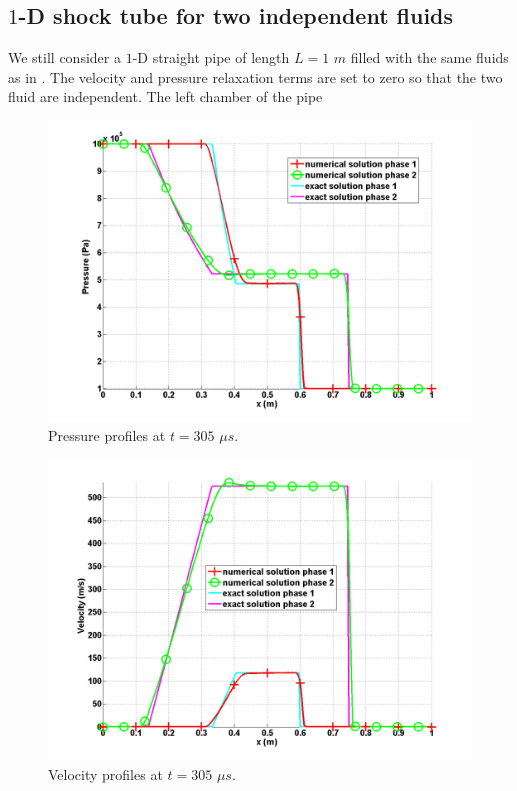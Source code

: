 \subsection{$1$-D shock tube for two independent fluids}\label{sec:1d-2-ind-phases-7-eq-sct4}
We still consider a $1$-D straight pipe of length $L=1$ $m$ filled with the same fluids as in . The velocity and pressure relaxation terms are set to zero so that the two fluid are independent. The left chamber of the pipe
%
\begin{figure}[H]
\centering
\includegraphics[width=\textwidth]{figures/two_phases_pressure.png}
\caption{Pressure profiles at $t=305$ $\mu s$.}
\label{fig:two-indep-fluids-press-7-eqn-sect4}
\end{figure}
%
\begin{figure}[H]
\centering
\includegraphics[width=\textwidth]{figures/two_phases_velocity.png}
\caption{Velocity profiles at $t=305$ $\mu s$.}
\label{fig:two-indep-fluids-vel-7-eqn-sect4}
\end{figure}
